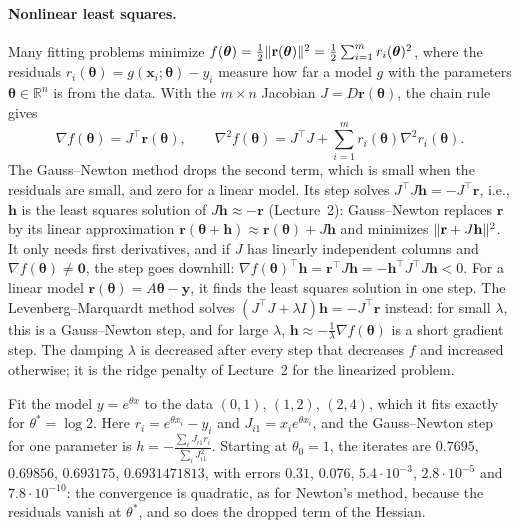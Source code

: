 \paragraph{Nonlinear least squares.} Many fitting problems minimize $f(\boldsymbol{\theta}) = \frac{1}{2}\lVert \mathbf{r}(\boldsymbol{\theta}) \rVert^2 = \frac{1}{2}\sum_{i=1}^m r_i(\boldsymbol{\theta})^2$, where the residuals $r_i(\boldsymbol{\theta}) = g(\mathbf{x}_i; \boldsymbol{\theta}) - y_i$ measure how far a model $g$ with the parameters $\boldsymbol{\theta} \in \mathbb{R}^n$ is from the data. With the $m \times n$ Jacobian $J = D\mathbf{r}(\boldsymbol{\theta})$, the chain rule gives
\[\nabla f(\boldsymbol{\theta}) = J^\top\mathbf{r}(\boldsymbol{\theta}), \qquad \nabla^2 f(\boldsymbol{\theta}) = J^\top J + \sum_{i=1}^m r_i(\boldsymbol{\theta})\nabla^2 r_i(\boldsymbol{\theta}).\]
The Gauss--Newton method drops the second term, which is small when the residuals are small, and zero for a linear model. Its step solves $J^\top J\mathbf{h} = -J^\top\mathbf{r}$, i.e., $\mathbf{h}$ is the least squares solution of $J\mathbf{h} \approx -\mathbf{r}$ (Lecture~2): Gauss--Newton replaces $\mathbf{r}$ by its linear approximation $\mathbf{r}(\boldsymbol{\theta} + \mathbf{h}) \approx \mathbf{r}(\boldsymbol{\theta}) + J\mathbf{h}$ and minimizes $\lVert \mathbf{r} + J\mathbf{h} \rVert^2$. It only needs first derivatives, and if $J$ has linearly independent columns and $\nabla f(\boldsymbol{\theta}) \neq \mathbf{0}$, the step goes downhill: $\nabla f(\boldsymbol{\theta})^\top\mathbf{h} = \mathbf{r}^\top J\mathbf{h} = -\mathbf{h}^\top J^\top J\mathbf{h} < 0$. For a linear model $\mathbf{r}(\boldsymbol{\theta}) = A\boldsymbol{\theta} - \mathbf{y}$, it finds the least squares solution in one step. The Levenberg--Marquardt method solves $(J^\top J + \lambda I)\mathbf{h} = -J^\top\mathbf{r}$ instead: for small $\lambda$, this is a Gauss--Newton step, and for large $\lambda$, $\mathbf{h} \approx -\frac{1}{\lambda}\nabla f(\boldsymbol{\theta})$ is a short gradient step. The damping $\lambda$ is decreased after every step that decreases $f$ and increased otherwise; it is the ridge penalty of Lecture~2 for the linearized problem.

\begin{example}\label{L3-ex:gauss-newton}
    Fit the model $y = e^{\theta x}$ to the data $(0, 1)$, $(1, 2)$, $(2, 4)$, which it fits exactly for $\theta^* = \log 2$. Here $r_i = e^{\theta x_i} - y_i$ and $J_{i1} = x_ie^{\theta x_i}$, and the Gauss--Newton step for one parameter is $h = -\frac{\sum_i J_{i1}r_i}{\sum_i J_{i1}^2}$. Starting at $\theta_0 = 1$, the iterates are $0.7695$, $0.69856$, $0.693175$, $0.6931471813$, with errors $0.31$, $0.076$, $5.4 \cdot 10^{-3}$, $2.8 \cdot 10^{-5}$ and $7.8 \cdot 10^{-10}$: the convergence is quadratic, as for Newton's method, because the residuals vanish at $\theta^*$, and so does the dropped term of the Hessian.
\end{example}

